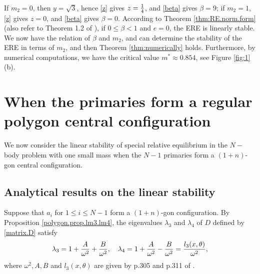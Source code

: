 \documentclass[11pt]{article}
\def\lm{{\lambda}}
\begin{document}
If $m_2=0$, then $y=\sqrt{3}$, hence \eqref{z} gives $z={1\over4}$,
and \eqref{beta} gives $\beta=9$;
if $m_2=1$, \eqref{z} gives $z=0$,
and \eqref{beta} gives $\beta=0$.
According to Theorem \ref{thm:RE.norm.form}
(also refer to Theorem 1.2 of \cite{HLS}), 
if $0\le\beta<1$ and $e=0$, the ERE is linearly stable.
We now have the relation of $\beta$ and $m_2$, and can determine  the stability of the ERE in terms of $m_2$,  and then
Theorem \ref{thm:numerically} holds.
Furthermore, by numerical computations,
we have the critical value $m^*\approx0.854$,
see Figure \ref{fig:1}(b).







\setcounter{equation}{0}%
\section{When the primaries form a regular polygon central configuration}\label{sec:4}

We now consider the linear stability of special relative equilibrium in the $N-$ body problem with one small mass when the $N-1$ primaries form a $(1+n)$-gon central configuration. 

\subsection{Analytical results on the linear stability}

Suppose that $a_i$ for $1\leq i\leq N-1$ form a  $(1+n)$-gon configuration. 
By Proposition \ref{polygon.prop.lm3.lm4},
the eigenvalues $\lm_3$ and $\lm_4$ of $D$ defined by \eqref{matrix.D} satisfy
\begin{align}
	\lm_3 = 1+{A\over\omega^2}+{B\over\omega^2},\quad
	\lm_4 = 1+{A\over\omega^2}-{B\over\omega^2}={l_3(x,\theta)\over\omega^2},
\end{align}
where  $\omega^2,A,B$ and $l_3(x,\theta)$ are given by p.305 and p.311 of \cite{BaE}.
\end{document}
